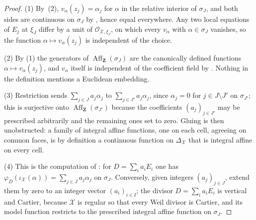 \begin{proof}
(1) By \,(2), $v_\alpha(z_j)=\alpha_j$ for
$\alpha$ in the relative interior of $\sigma_J$, and both sides are
continuous on $\sigma_J$ by , hence equal
everywhere. Any two local equations of $E_j$ at $\xi_J$ differ by a unit
of $\mathcal O_{\mathcal X,\xi_J}$, on which every $v_\alpha$ with
$\alpha\in\sigma_J$ vanishes, so the function $\alpha\mapsto
v_\alpha(z_j)$ is independent of the choice.

(2) By (1) the generators of $\operatorname{Aff}_{\mathbf Z}(\sigma_J)$ are the
canonically defined functions $\alpha\mapsto v_\alpha(z_j)$, and
$v_\alpha$ itself is independent of the coefficient field by
. Nothing in the definition mentions a
Euclidean embedding.

(3) Restriction sends $\sum_{j\in J}a_j\alpha_j$ to
$\sum_{j\in J'}a_j\alpha_j$, since $\alpha_j=0$ for
$j\in J\setminus J'$ on $\sigma_{J'}$; this is surjective onto
$\operatorname{Aff}_{\mathbf Z}(\sigma_{J'})$ because the coefficients
$(a_j)_{j\in J'}$ may be prescribed arbitrarily and the remaining ones set
to zero. Gluing is then unobstructed: a family of integral affine functions,
one on each cell, agreeing on common faces, is by definition a continuous
function on $\Delta_{\mathcal X}$ that is integral affine on every cell.

(4) This is the computation of : for
$D=\sum_ia_iE_i$ one has
$\varphi_D(\iota_{\mathcal X}(\alpha))=\sum_{j\in J}a_j\alpha_j$ on
$\sigma_J$. Conversely, given integers $(a_j)_{j\in J}$, extend them by
zero to an integer vector $(a_i)_{i\in I}$; the divisor
$D=\sum_ia_iE_i$ is vertical and Cartier, because $\mathcal X$ is
regular so that every Weil divisor is Cartier, and its model function
restricts to the prescribed integral affine function on $\sigma_J$.
\end{proof}

